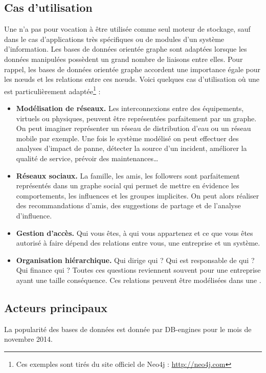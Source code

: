 \subsection{Cas d'utilisation}
	Une \bddGraphe{} n'a pas pour vocation à être utilisée comme seul moteur de stockage, sauf dans le cas d'applications très spécifiques ou de modules d'un système d'information. Les bases de données orientée graphe sont adaptées lorsque les données manipulées possèdent un grand nombre de liaisons entre elles. Pour rappel, les bases de données orientée graphe accordent une importance égale pour les nœuds et les relations entre ces nœuds. Voici quelques cas d'utilisation où une \bddGraphe{} est particulièrement adaptée\footnote{Ces exemples sont tirés du site officiel de Neo4j : \url{http://neo4j.com}} :
	\vspace{10px}
	\begin{itemize}
	 	\item \textbf{Modélisation de réseaux.} Les interconnexions entre des équipements, virtuels ou physiques, peuvent être représentées parfaitement par un graphe. On peut imaginer représenter un réseau de distribution d'eau ou un réseau mobile par exemple. Une fois le système modélisé on peut effectuer des analyses d'impact de panne, détecter la source d'un incident, améliorer la qualité de service, prévoir des maintenances\dots
	 	\item \textbf{Réseaux sociaux.} La famille, les amis, les followers sont parfaitement représentés dans un graphe social qui permet de mettre en évidence les comportements, les influences et les groupes implicites. On peut alors réaliser des recommandations d'amis, des suggestions de partage et de l'analyse d'influence.
	 	\item \textbf{Gestion d'accès.} Qui vous êtes, à qui vous appartenez et ce que vous êtes autorisé à faire dépend des relations entre vous, une entreprise et un système.
	 	\item \textbf{Organisation hiérarchique.} Qui dirige qui ? Qui est responsable de qui ? Qui finance qui ? Toutes ces questions reviennent souvent pour une entreprise ayant une taille conséquence. Ces relations peuvent être modélisées dans une \bddGraphe{}.
	 \end{itemize}

\subsection{Acteurs principaux}
	La popularité des bases de données est donnée par DB-engines\cite{db_engines_key_value} pour le mois de novembre 2014.


